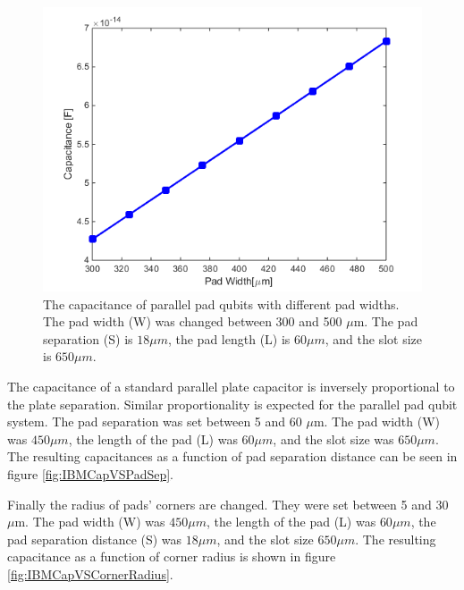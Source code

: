 \begin{figure}
	\centering
	\includegraphics[scale = 0.7]{Figures/Capacitance_plots/IBMCapVSWidth}
	\caption{The capacitance of parallel pad qubits with different pad widths. The pad width (W) was changed between 300 and 500 \(\mu\)m. The pad separation (S) is \(18 \mu m\), the pad length (L) is \(60 \mu m\), and the slot size is \(650 \mu m\).}
	\label{fig:IBMCapVSWidth}
\end{figure}

The capacitance of a standard parallel plate capacitor is inversely proportional to the plate separation. Similar proportionality is expected for the parallel pad qubit system. The pad separation was set between 5 and 60 \(\mu\)m. The pad width (W) was \(450 \mu m\), the length of the pad (L) was \(60 \mu m\), and the slot size was \(650 \mu m\). The resulting capacitances as a function of pad separation distance can be seen in figure \ref{fig:IBMCapVSPadSep}.

Finally the radius of pads' corners are changed. They were set between 5 and 30 \(\mu\)m. The pad width (W) was \(450 \mu m\), the length of the pad (L) was \(60 \mu m\), the pad separation distance (S) was \(18 \mu m\), and the slot size \(650 \mu m\). The resulting capacitance as a function of corner radius is shown in figure \ref{fig:IBMCapVSCornerRadius}.

